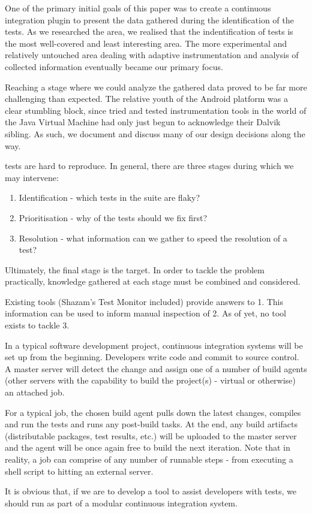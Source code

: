 One of the primary initial goals of this paper was to create a continuous
integration plugin to present the data gathered during the identification of the
\flaky tests. As we researched the area, we realised that the indentification of
\flaky tests is the most well-covered and least interesting area. The more
experimental and relatively untouched area dealing with adaptive instrumentation
and analysis of collected information eventually became our primary focus.

Reaching a stage where we could analyze the gathered data proved to be far more
challenging than expected. The relative youth of the Android platform was a
clear stumbling block, since tried and tested instrumentation tools in the world
of the Java Virtual Machine had only just begun to acknowledge their Dalvik
sibling. As such, we document and discuss many of our design decisions along the
way.

\flaky tests are hard to reproduce. In general, there are three stages during
which we may intervene:
\begin{enumerate}
	\item Identification - which tests in the suite are flaky?
	\item Prioritisation - why of the \flaky tests should we fix first?
	\item Resolution - what information can we gather to speed the resolution of a test?
\end{enumerate}

Ultimately, the final stage is the target. In order to tackle the problem
practically, knowledge gathered at each stage must be combined and considered.

Existing tools (Shazam’s \flaky Test Monitor included) provide answers to 1.
This information can be used to inform manual inspection of 2. As of yet, no
tool exists to tackle 3.

In a typical software development project, continuous integration systems will
be set up from the beginning. Developers write code and commit to source
control. A master server will detect the change and assign one of a number of
build agents (other servers with the capability to build the project(s) -
virtual or otherwise) an attached job.

For a typical job, the chosen build agent pulls down the latest changes,
compiles and run the tests and runs any post-build tasks. At the end, any build
artifacts (distributable packages, test results, etc.) will be uploaded to the
master server and the agent will be once again free to build the next iteration.
Note that in reality, a job can comprise of any number of runnable steps - from
executing a shell script to hitting an external server.


It is obvious that, if we are to develop a tool to assist developers with \flaky
tests, we should run as part of a modular continuous integration system.


